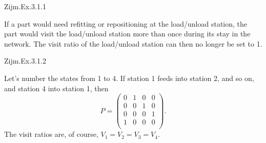 \begin{comment}
\begin{exercise}
  What if $P$ has an eigenvalue $\alpha$ whose modulus $|\alpha|>$? What if for all eigenvalues $\alpha_i$ we have that $|\alpha_i|<1$?
  \begin{solution}
    TBD.
  \end{solution}
\end{exercise}
\end{comment}

\begin{exercise}
Zijm.Ex.3.1.1 
\begin{solution}
If a part would need refitting or repositioning at the load/unload station, the part would visit the load/unload station more than once during its stay in the network. The visit ratio of the load/unload station can then no longer be set to 1.
\end{solution}
\end{exercise}

\begin{exercise}
Zijm.Ex.3.1.2
\begin{solution}
Let's number the states from 1 to 4. If station 1 feeds into station 2, and so on, and station 4 into station 1, then 
\begin{equation*}
  P = 
  \begin{pmatrix}
    0 & 1 & 0 & 0\\
    0 & 0 & 1 & 0\\
    0 & 0 & 0 & 1\\
    1 & 0 & 0 & 0\\
  \end{pmatrix}.
\end{equation*}
The visit ratios are, of course, $V_1= V_2 = V_3 = V_4$. 
\end{solution}
\end{exercise}

